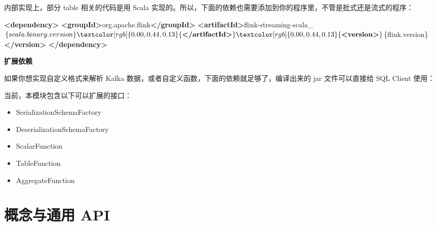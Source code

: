 \documentclass[cn,11pt,chinese]{elegantbook}
\newenvironment{Shaded}{}{}
\newcommand{\KeywordTok}[1]{\textcolor[rgb]{0.00,0.44,0.13}{\textbf{#1}}}
\newcommand{\NormalTok}[1]{#1}
\providecommand{\tightlist}{%
  \setlength{\itemsep}{0pt}\setlength{\parskip}{0pt}}
\begin{document}
内部实现上，部分 table 相关的代码是用 Scala
实现的。所以，下面的依赖也需要添加到你的程序里，不管是批式还是流式的程序：

\begin{Shaded}
\begin{Highlighting}[]
\KeywordTok{\textless{}dependency\textgreater{}}
    \KeywordTok{\textless{}groupId\textgreater{}}\NormalTok{org.apache.flink}\KeywordTok{\textless{}/groupId\textgreater{}}
    \KeywordTok{\textless{}artifactId\textgreater{}}\NormalTok{flink{-}streaming{-}scala\_$\{scala.binary.version\}}\KeywordTok{\textless{}/artifactId\textgreater{}}
    \KeywordTok{\textless{}version\textgreater{}}\NormalTok{$\{flink.version\}}\KeywordTok{\textless{}/version\textgreater{}}
\KeywordTok{\textless{}/dependency\textgreater{}}
\end{Highlighting}
\end{Shaded}

\textbf{扩展依赖}

如果你想实现自定义格式来解析 Kafka
数据，或者自定义函数，下面的依赖就足够了，编译出来的 jar 文件可以直接给
SQL Client 使用：

\begin{Shaded}
\end{Shaded}

当前，本模块包含以下可以扩展的接口：

\begin{itemize}
\tightlist
\item
  SerializationSchemaFactory
\item
  DeserializationSchemaFactory
\item
  ScalarFunction
\item
  TableFunction
\item
  AggregateFunction
\end{itemize}

\hypertarget{ux6982ux5ff5ux4e0eux901aux7528-api}{%
\section{概念与通用 API}\label{ux6982ux5ff5ux4e0eux901aux7528-api}}
\end{document}
